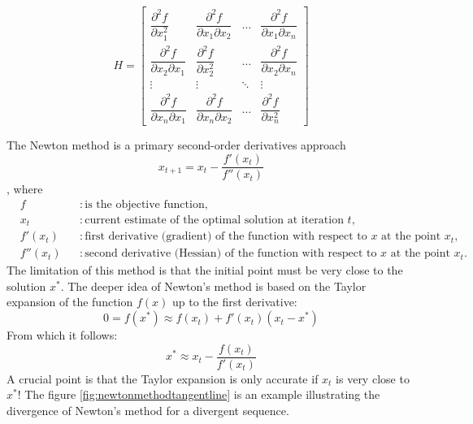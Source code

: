 \documentclass[12pt,a4paper]{article}
\begin{document}
\begin{equation} \label{hessian}
	H = \begin{bmatrix}
		\dfrac{\partial^2 f}{\partial x_1^2} & \dfrac{\partial^2 f}{\partial x_1 \partial x_2} & \ldots & \dfrac{\partial^2 f}{\partial x_1 \partial x_n} \\
		\dfrac{\partial^2 f}{\partial x_2 \partial x_1} & \dfrac{\partial^2 f}{\partial x_2^2} & \ldots & \dfrac{\partial^2 f}{\partial x_2 \partial x_n} \\
		\vdots & \vdots & \ddots & \vdots \\
		\dfrac{\partial^2 f}{\partial x_n \partial x_1} & \dfrac{\partial^2 f}{\partial x_n \partial x_2} & \ldots & \dfrac{\partial^2 f}{\partial x_n^2}
	\end{bmatrix}	
\end{equation}

The Newton method is a primary second-order derivatives approach
\begin{equation}
	x_{t+1} = x_t - \dfrac{f'(x_t)}{f''(x_t)}
\end{equation}
, where
\begin{align*}
	& f && : \text{is the objective function}, \\
	& x_{t} && : \text{current estimate of the optimal solution at iteration } t, \\
	& f'(x_t) && : \text{first derivative (gradient) of the function with respect to } x \text{ at the point } x_t, \\
	& f''(x_t) && : \text{second derivative (Hessian) of the function with respect to } x \text{ at the point } x_t.
\end{align*}
The limitation of this method is that the initial point must be very close to the solution \(x^*\). The deeper idea of Newton's method is based on the Taylor expansion of the function \(f(x)\) up to the first derivative:
\begin{equation}
	0 = f(x^*) \approx f(x_t) + f'(x_t)(x_t - x^*)	
\end{equation}
From which it follows:
\begin{equation}
	x^* \approx x_t - \frac{f(x_t)}{f'(x_t)}
\end{equation}
A crucial point is that the Taylor expansion is only accurate if \(x_t\) is very close to \(x^*\)! The figure \ref{fig:newtonmethodtangentline} is an example illustrating the divergence of Newton's method for a divergent sequence.
\end{document}
